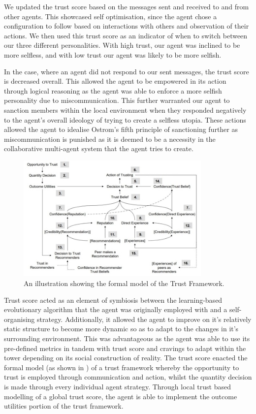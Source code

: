 We updated the trust score based on the messages sent and received to and from other agents. This showcased self optimisation, since the agent chose a configuration to follow based on interactions with others and observation of their actions. We then used this trust score as an indicator of when to switch between our three different personalities. With high trust, our agent was inclined to be more selfless, and with low trust our agent was likely to be more selfish.

In the case, where an agent did not respond to our sent messages, the trust score is decreased overall. This allowed the agent to be empowered in its action through logical reasoning as the agent was able to enforce a more selfish personality due to miscommunication. This further warranted our agent to sanction members within the local environment when they responded negatively to the agent's overall ideology of trying to create a selfless utopia. These actions allowed the agent to idealise Ostrom's fifth principle of sanctioning further as miscommunication is punished as it is deemed to be a necessity in the collaborative multi-agent system that the agent tries to create.

\begin{figure}[htb]
    \centering
    \includegraphics[width=0.85\textwidth]{006_team_4_agent_design/assets/JeremyPittTrustFramework.jpg}
    \caption{An illustration showing the formal model of the Trust Framework. \cite{JeremyPittSlides}}
    \label{fig:TrustFramework}
\end{figure}

Trust score acted as an element of symbiosis between the learning-based evolutionary algorithm that the agent was originally employed with and a self-organising strategy. Additionally, it allowed the agent to improve on it's relatively static structure to become more dynamic so as to adapt to the changes in it's surrounding environment. This was advantageous as the agent was able to use its pre-defined metrics in tandem with trust score and cravings to adapt within the tower depending on its social construction of reality. The trust score enacted the formal model (as shown in ) of a trust framework whereby the opportunity to trust is employed through communication and action, whilst the quantity decision is made through every individual agent strategy. Through local trust based modelling of a global trust score, the agent is able to implement the outcome utilities portion of the trust framework.

